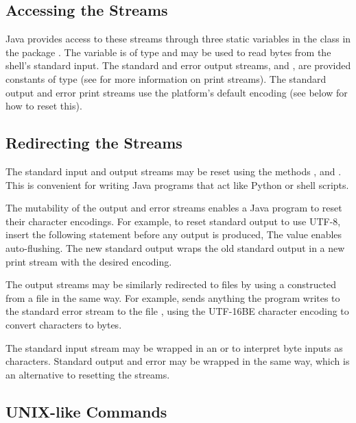 \subsection{Accessing the Streams}

Java provides access to these streams through three static variables
in the class  in the package .  The
variable  is of type 
and may be used to read bytes from the shell's standard input.  The
standard and error output streams,  and
, are provided constants of type 
(see  for more information on print streams).
The standard output and error print streams use the platform's
default encoding (see below for how to reset this).

\subsection{Redirecting the Streams}\label{section:io-reset-system-out}

The standard input and output streams may be reset using the methods
,  and
.  This is convenient for writing Java
programs that act like Python or shell scripts.  

The mutability of the output and error streams enables a Java program
to reset their character encodings.  For example, to reset standard
output to use UTF-8, insert the following statement before any
output is produced,
%
%
The value  enables auto-flushing.  The new standard
output wraps the old standard output in a new print stream
with the desired encoding. 

The output streams may be similarly redirected to files by using a
 constructed from a file in the same way.  For
example,
%
%
sends anything the program writes to the standard error stream to the
file , using the UTF-16BE character encoding
to convert characters to bytes.

The standard input stream may be wrapped in an
 or  to interpret byte
inputs as characters.  Standard output and error may be wrapped in the
same way, which is an alternative to resetting the streams.

\subsection{UNIX-like Commands}

